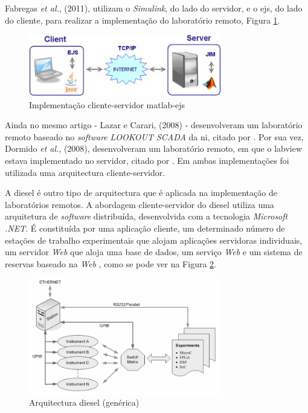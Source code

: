 Fabregas \textit{et al.}, (2011), utilizam o \textit{Simulink}, do lado do servidor, e o \acrfull{ejs}, do lado do cliente, para realizar a implementação do \acrshort{laboratório remoto}\cite{FABREGAS20111686}, Figura \ref{fig:ejs}.
\begin{figure}[hbtp]
    \centering
    \includegraphics[width=0.75\textwidth]{figures/sej.jpg}
    \caption{Implementação cliente-servidor \acrshort{matlab}-\acrshort{ejs}}
    \label{fig:ejs}
\end{figure}
Ainda no mesmo artigo - Lazar e Carari, (2008) - desenvolveram um \acrshort{laboratório remoto} baseado no \textit{software} \textit{LOOKOUT SCADA} da \acrfull{ni}, \cite{lazar} citado por \cite{FABREGAS20111686}.
Por sua vez, Dormido \textit{et al.}, (2008), desenvolveram um \acrshort{laboratório remoto}, em que o \acrfull{labview} estava implementado no servidor, \cite{dormido} citado por \cite{FABREGAS20111686}. Em ambas implementações foi utilizada uma arquitectura cliente-servidor.

A \acrfull{diesel} é outro tipo de arquitectura que é aplicada na implementação de laboratórios remotos. A abordagem cliente-servidor do \acrshort{diesel} utiliza uma arquitetura de \textit{software} distribuída, desenvolvida com a tecnologia \textit{Microsoft .NET}. É constituída por uma aplicação cliente, um determinado número de estações de trabalho experimentais que alojam aplicações servidoras individuais, um servidor \textit{Web} que aloja uma base de dados, um serviço \textit{Web} e um sistema de reservas baseado na \textit{Web} \cite{diesel}, como se pode ver na Figura \ref{fig:resumoarquitectura}. 
\begin{figure}[hbtp]
    \centering
    \includegraphics[width=0.75\textwidth]{figures/diesel.png}
    \caption{Arquitectura \acrshort{diesel} (genérica)\cite{diesel}}
    \label{fig:resumoarquitectura}
\end{figure}

